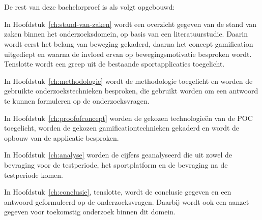 
\section{}%
\label{sec:opzet-bachelorproef}

De rest van deze bachelorproef is als volgt opgebouwd:

In Hoofdstuk~\ref{ch:stand-van-zaken} wordt een overzicht gegeven van de stand van zaken binnen het onderzoeksdomein, op basis van een literatuurstudie. Daarin wordt eerst het belang van beweging gekaderd, daarna het concept gamification uitgediept en waarna de invloed ervan op bewegingsmotivatie besproken wordt. Tenslotte wordt een greep uit de bestaande sportapplicaties toegelicht.

In Hoofdstuk~\ref{ch:methodologie} wordt de methodologie toegelicht en worden de gebruikte onderzoekstechnieken besproken, die gebruikt worden om een antwoord te kunnen formuleren op de onderzoeksvragen.

In Hoofdstuk~\ref{ch:proofofconcept} worden de gekozen technologieën van de POC toegelicht, worden de gekozen gamificationtechnieken gekaderd en wordt de opbouw van de applicatie besproken.

In Hoofdstuk~\ref{ch:analyse} worden de cijfers geanalyseerd die uit zowel de bevraging voor de testperiode, het sportplatform en de bevraging na de testperiode komen.

In Hoofdstuk~\ref{ch:conclusie}, tenslotte, wordt de conclusie gegeven en een antwoord geformuleerd op de onderzoeksvragen. Daarbij wordt ook een aanzet gegeven voor toekomstig onderzoek binnen dit domein.
